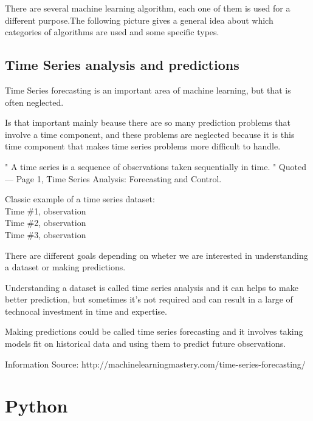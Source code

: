 There are several machine learning algorithm, each one of them is used for a different purpose.The following picture gives a general idea about which categories of algorithms are used and some specific types.


\subsection{Time Series analysis and predictions}
Time Series forecasting is an important area of machine learning, but that is often neglected.

Is that important mainly beause there are so many prediction problems that involve a time component, and these problems are neglected because it is this time component that makes time series problems more difficult to handle.

" A time series is a sequence of observations taken sequentially in time. "
Quoted — Page 1, Time Series Analysis: Forecasting and Control.

Classic example of a time series dataset:\\ 		
Time \#1, observation\\
Time \#2, observation\\
Time \#3, observation

There are different goals depending on wheter we are interested in understanding a dataset or making predictions.

Understanding a dataset is called time series analysis and it can helps to make better prediction, but sometimes it's not required and can result in a large of technocal investment in time and expertise.

Making predictions could be called time series forecasting and it involves taking models fit on historical data and using them to predict future observations.

Information Source: http://machinelearningmastery.com/time-series-forecasting/
\section{Python}


